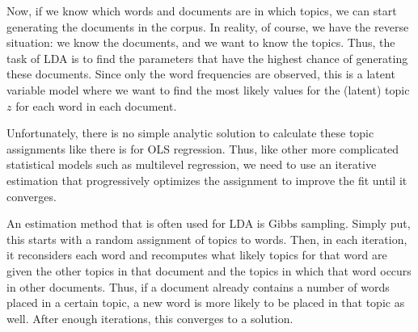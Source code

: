 Now, if we  know which words and documents are in which topics, we can start generating the documents in the corpus.
In reality, of course, we have the reverse situation:
we know the documents, and we want to know the topics.
Thus, the task of LDA is to find the parameters that have the highest chance of generating these documents.
Since only the word frequencies are observed, this is a latent variable model where we want to find the
most likely values for the (latent) topic $z$ for each word in each document.

Unfortunately, there is no simple analytic solution to calculate these topic assignments
like there is for OLS regression.
Thus, like other more complicated statistical models such as multilevel regression,
we need to use an iterative estimation that progressively optimizes the assignment to improve the fit until it converges.

An estimation method that is often used for LDA is Gibbs sampling.
Simply put, this starts with a random assignment of topics to words.
Then, in each iteration, it reconsiders each word and recomputes what likely topics for that word are
given the other topics in that document and the topics in which that word occurs in  other documents.
Thus, if a document already contains a number of words placed in a certain topic,
a new word is more likely to be placed in that topic as well.
After enough iterations, this converges to a solution.

